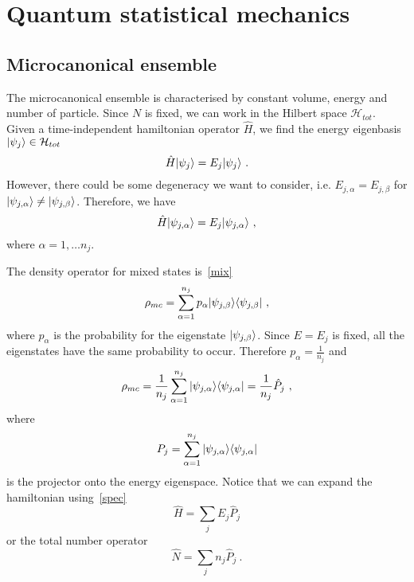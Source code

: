 \part{Quantum statistical mechanics}

\chapter{Microcanonical ensemble}

    The microcanonical ensemble is characterised by constant volume, energy and number of particle. Since $N$ is fixed, we can work in the Hilbert space $\mathcal H_{tot}$. Given a time-independent hamiltonian operator $\hat H$, we find the energy eigenbasis $\vert\psi_j\rangle \in \mathcal H_{tot}$ 
    \begin{equation*}
        \hat H \vert\psi_j\rangle = E_j \vert\psi_j\rangle ~.
    \end{equation*}
    However, there could be some degeneracy we want to consider, i.e. $E_{j,\alpha} = E_{j, \beta}$ for $\vert\psi_{j, \alpha}\rangle \neq \vert\psi_{j, \beta}\rangle$. Therefore, we have 
    \begin{equation}\label{eneigen}
        \hat H \vert\psi_{j,\alpha}\rangle = E_j \vert\psi_{j,\alpha}\rangle ~,
    \end{equation}
    where $\alpha = 1, \ldots n_j$.

    The density operator for mixed states is~\eqref{mix}
    \begin{equation*}
        \rho_{mc} = \sum_{\alpha=1}^{n_j} p_\alpha \vert\psi_{j, \beta}\rangle \langle\psi_{j, \beta}\vert ~,
    \end{equation*}
    where $p_\alpha$ is the probability for the eigenstate $\vert\psi_{j, \beta}\rangle$. Since $E = E_j$ is fixed, all the eigenstates have the same probability to occur. Therefore $p_\alpha = \frac{1}{n_j}$ and 
    \begin{equation*}
        \rho_{mc} = \frac{1}{n_j} \sum_{\alpha=1}^{n_j} \vert\psi_{j, \alpha}\rangle \langle\psi_{j, \alpha}\vert = \frac{1}{n_j} \hat P_j ~,
    \end{equation*}
    where 
    \begin{equation*}
        P_j = \sum_{\alpha=1}^{n_j} \vert\psi_{j, \alpha}\rangle \langle\psi_{j, \alpha}\vert
    \end{equation*} 
    is the projector onto the energy eigenspace. Notice that we can expand the hamiltonian using~\eqref{spec}
    \begin{equation}\label{endec}
        \hat H = \sum_j E_j \hat P_j 
    \end{equation}
    or the total number operator 
    \begin{equation}\label{numb}
        \hat N = \sum_j n_j \hat P_j ~.
    \end{equation}

